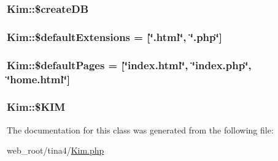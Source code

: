 \subsubsection[{\$create\+D\+B}]{\setlength{\rightskip}{0pt plus 5cm}Kim\+::\$create\+D\+B}\label{classKim_a68fb575a2ef7faf6b3b679280331033d}
\hypertarget{classKim_aecfd2bbe4c11ceb39810c393cd357b53}{}
\subsubsection[{\$default\+Extensions}]{\setlength{\rightskip}{0pt plus 5cm}Kim\+::\$default\+Extensions = \mbox{[}\char`\"{}.html\char`\"{}, \char`\"{}.php\char`\"{}\mbox{]}}\label{classKim_aecfd2bbe4c11ceb39810c393cd357b53}
\hypertarget{classKim_a761d5be4968e338c3d7ffa9f65ae3a40}{}
\subsubsection[{\$default\+Pages}]{\setlength{\rightskip}{0pt plus 5cm}Kim\+::\$default\+Pages = \mbox{[}\char`\"{}index.\+html\char`\"{}, \char`\"{}index.\+php\char`\"{}, \char`\"{}{\bf home.\+html}\char`\"{}\mbox{]}}\label{classKim_a761d5be4968e338c3d7ffa9f65ae3a40}
\hypertarget{classKim_a46554f1a34a5f3db1014d47b6ec37f00}{}
\subsubsection[{\$\+K\+I\+M}]{\setlength{\rightskip}{0pt plus 5cm}Kim\+::\$\+K\+I\+M}\label{classKim_a46554f1a34a5f3db1014d47b6ec37f00}


The documentation for this class was generated from the following file\+:\begin{DoxyCompactItemize}
\item 
web\+\_\+root/tina4/\hyperlink{Kim_8php}{Kim.\+php}\end{DoxyCompactItemize}
